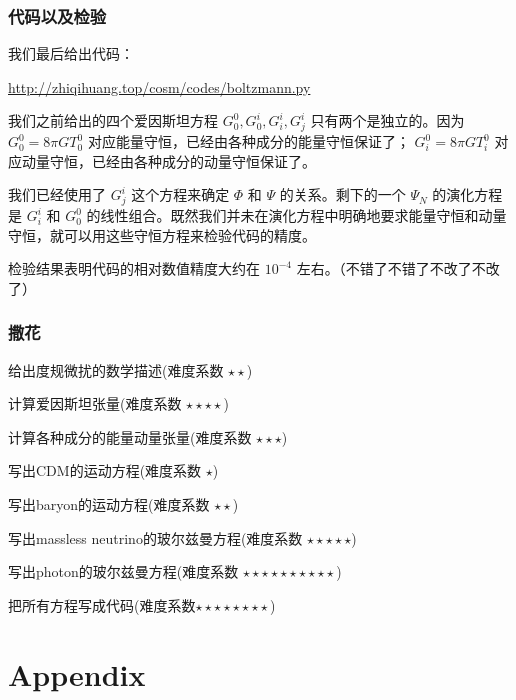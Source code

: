 \documentclass[CJK,13pt]{beamer}
\begin{document}
    \begin{frame}
      \frametitle{代码以及检验}
      我们最后给出代码：

      \url{http://zhiqihuang.top/cosm/codes/boltzmann.py}

            \skipline
      
      我们之前给出的四个爱因斯坦方程 $G^0_0, G^i_0, G^i_i, G^i_j$ 只有两个是独立的。因为 $G^0_0 = 8\pi GT^0_0 $ 对应能量守恒，已经由各种成分的能量守恒保证了； $G^0_i = 8\pi G T^0_i$ 对应动量守恒，已经由各种成分的动量守恒保证了。

      \skipline
      
      我们已经使用了 $G^i_j$ 这个方程来确定 $\Phi$  和 $\Psi$ 的关系。剩下的一个  $\Psi_N$ 的演化方程是 $G^i_i$ 和 $ G^0_0$ 的线性组合。既然我们并未在演化方程中明确地要求能量守恒和动量守恒，就可以用这些守恒方程来检验代码的精度。

      \skipline

      检验结果表明代码的相对数值精度大约在 $10^{-4}$ 左右。（不错了不错了不改了不改了）
    \end{frame}    

    
  \begin{frame}
    \frametitle{撒花}
    \bitem
  \item[\checkmark]{给出度规微扰的数学描述(难度系数 $\star\star$)}
  \item[\checkmark]{计算爱因斯坦张量(难度系数 $\star\star\star\star$)}
  \item[\checkmark]{计算各种成分的能量动量张量(难度系数 $\star\star\star$)}    
  \item[\checkmark]{写出CDM的运动方程(难度系数 $\star$)}
  \item[\checkmark]{写出baryon的运动方程(难度系数 $\star\star$)}        
  \item[\checkmark]{写出massless neutrino的玻尔兹曼方程(难度系数 $\star\star\star\star\star$)}
  \item[\checkmark]{写出photon的玻尔兹曼方程(难度系数 $\star\star\star\star\star\star\star\star\star\star$)}
  \item[\checkmark]{把所有方程写成代码(难度系数$\star\star\star\star\star\star\star\star$)}
    \eitem
  \end{frame}
  
  \section{Appendix}

\end{document}
